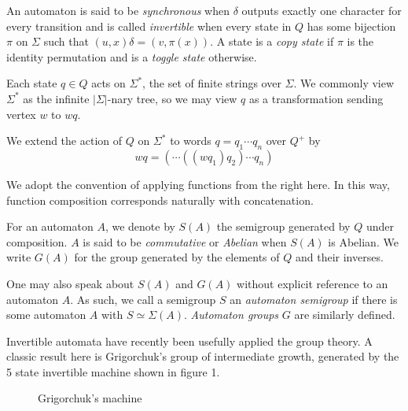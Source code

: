 \documentclass[10pt]{article}
\newcommand{\defn}[1]{\textit{#1}}
\begin{document}
An automaton is said to be \defn{synchronous} when $\delta$ outputs
exactly one character for every transition and is called
\defn{invertible} when every state in $Q$ has some bijection $\pi$ on
$\Sigma$ such that $(u, x)\delta = (v, \pi(x))$. A state is a
\defn{copy state} if $\pi$ is the identity permutation and is a
\defn{toggle state} otherwise.

Each state $q \in Q$ acts on $\Sigma^*$, the set of finite strings
over $\Sigma$. We commonly view $\Sigma^*$ as the infinite
$|\Sigma|$-nary tree, so we may view $q$ as a transformation sending
vertex $w$ to $wq$.

We extend the action of $Q$ on $\Sigma^*$ to words $q = q_1\cdots q_n$
over $Q^+$ by \[ wq = (\cdots((w q_1) q_2)\cdots q_n) \]

We adopt the convention of applying functions from the right here. In
this way, function composition corresponds naturally with
concatenation.

For an automaton $A$, we denote by $S(A)$ the semigroup generated by
$Q$ under composition. $A$ is said to be \defn{commutative} or
\defn{Abelian} when $S(A)$ is Abelian. We write $G(A)$ for the group
generated by the elements of $Q$ and their inverses.

One may also speak about $S(A)$ and $G(A)$ without explicit reference
to an automaton $A$. As such, we call a semigroup $S$ an
\defn{automaton semigroup} if there is some automaton $A$ with
$S \simeq \Sigma(A)$. \defn{Automaton groups} $G$ are similarly
defined.

Invertible automata have recently been usefully applied the group
theory. A classic result here is Grigorchuk's group of intermediate
growth, generated by the 5 state invertible machine shown in figure 1.

\begin{figure}
\begin{center}
\caption{Grigorchuk's machine}
\end{center}
\end{figure}
\end{document}
